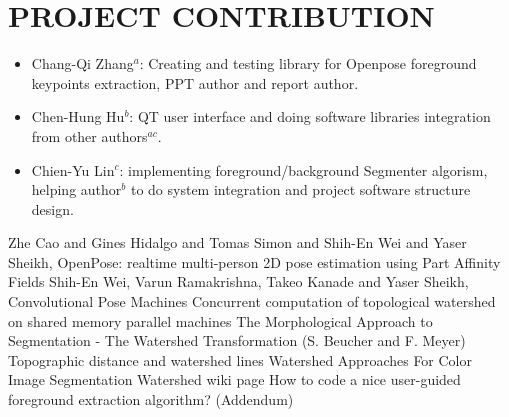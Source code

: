 \documentclass[letterpaper, 10 pt, conference]{ieeeconf}  %
\begin{document}
\section{PROJECT CONTRIBUTION}
\begin{itemize}
   \item Chang-Qi Zhang$^{a}$: Creating and testing library for Openpose foreground 
   keypoints extraction, PPT author and report author.
   \item Chen-Hung Hu$^{b}$: QT user interface and doing software libraries integration from
   other authors$^{ac}$.
   \item Chien-Yu Lin$^{c}$: implementing foreground/background Segmenter algorism, helping 
   author$^{b}$ to do system integration and project software structure design.
\end{itemize}

\begin{thebibliography}{99}
 Zhe Cao and Gines Hidalgo and Tomas Simon and Shih-En Wei and Yaser Sheikh, Open{P}ose: realtime multi-person 2{D} pose estimation using {P}art {A}ffinity {F}ields
 Shih-En Wei, Varun Ramakrishna, Takeo Kanade and Yaser Sheikh, Convolutional Pose Machines
\bibitem{} Concurrent computation of topological watershed on shared memory parallel machines
\bibitem{} The Morphological Approach to Segmentation - The Watershed Transformation (S. Beucher and F. Meyer)
\bibitem{} Topographic distance and watershed lines
\bibitem{} Watershed Approaches For Color Image Segmentation 
\bibitem{} Watershed wiki page
\bibitem{} How to code a nice user-guided foreground extraction algorithm? (Addendum)
\end{thebibliography}
\end{document}
